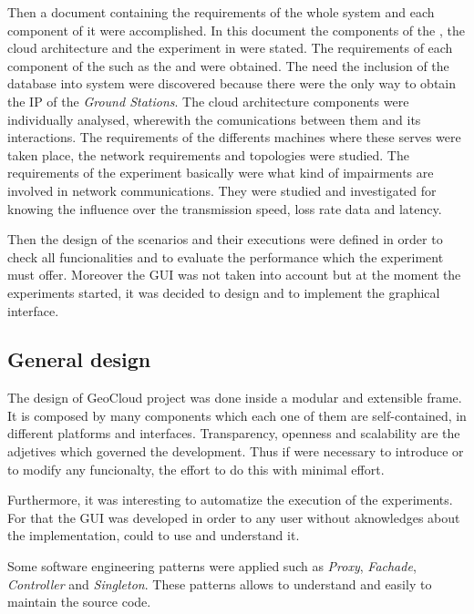 Then a document containing the requirements of the whole system and each
component of it were accomplished. In this document the components of the \sss,
the cloud architecture and the experiment in \pl were stated. The requirements
of each component of
the \sss such as the \satss and \gsss were obtained. The need the inclusion of
the database into system were discovered because there were the only way to obtain the
\ac{IP} of the \emph{Ground Stations}. The cloud architecture components were
individually analysed, wherewith the comunications between them and its
interactions. The requirements of the differents machines where these serves
were taken place, the network requirements and topologies were studied.  
The requirements of the \pl experiment basically were what kind of impairments
are involved in network communications. They were studied and investigated for
knowing the influence over the transmission speed, loss rate data and latency.

Then the design of the scenarios and their executions were defined in order to
check all funcionalities and to evaluate the performance which the experiment must offer.
Moreover the \ac{GUI} was not taken into account but at the moment the
experiments started, it was decided to design and to implement the graphical interface.


\subsection{General design}

The design of GeoCloud project was done inside a modular and extensible
frame. It is composed by many components which each one of them are
self-contained, in different platforms and interfaces. Transparency, openness
and scalability are the adjetives which governed the development. Thus if were
necessary to introduce or to modify any funcionalty, the effort to do this with
minimal effort.

Furthermore, it was interesting to automatize the execution of the
experiments. For that the \ac{GUI} was developed in order to any user without
aknowledges about the implementation, could to use and understand it.

Some software engineering patterns were applied such as \emph{Proxy},
\emph{Fachade}, \emph{Controller} and \emph{Singleton}. These patterns allows to understand and easily to
maintain the source code. 

